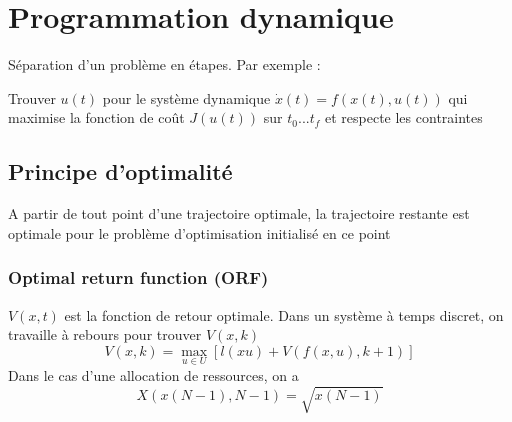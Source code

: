\documentclass[resume]{subfiles}
\begin{document}
\section{Programmation dynamique}
Séparation d'un problème en étapes. Par exemple :
\begin{center}
Trouver $u(t)$ pour le système dynamique $\dot{x}(t)=f(x(t),u(t))$ qui maximise la fonction de coût $J(u(t))$ sur $t_0...t_f$ et respecte les contraintes
\end{center}
\subsection{Principe d'optimalité}
A partir de tout point d'une trajectoire optimale, la trajectoire restante est optimale pour le problème d'optimisation initialisé en ce point
\subsubsection{Optimal return function (ORF)}
$V(x,t)$ est la fonction de retour optimale. Dans un système à temps discret, on travaille à rebours pour trouver $V(x,k)$
$$V(x,k)=\max_{u\in U}\left[l(xu)+V(f(x,u),k+1)\right]$$
Dans le cas d'une allocation de ressources, on a 
$$X(x(N-1),N-1)=\sqrt{x(N-1)}$$
\end{document}
